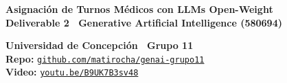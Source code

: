 \documentclass[9pt,a4paper]{extarticle}
\begin{document}
\fontsize{7.9}{9.1}\selectfont

\begin{tcolorbox}[colback=boxbg,colframe=boxframe,arc=1.5mm,boxrule=0.8pt,top=2pt,bottom=2pt,left=7pt,right=7pt]
\begin{minipage}[c]{0.64\textwidth}
    {\fontsize{11.5}{13}\selectfont \textbf{Asignación de Turnos Médicos con LLMs Open-Weight}}\\[1pt]
    {\fontsize{8.3}{9.5}\selectfont \textbf{Deliverable 2 \textbar\ Generative Artificial Intelligence (580694)}}
\end{minipage}\hfill
\begin{minipage}[c]{0.35\textwidth}\raggedleft
    {\fontsize{7.8}{9}\selectfont \textbf{Universidad de Concepción \textbar\ Grupo 11}}\\
    {\fontsize{6.8}{8}\selectfont \textbf{Repo:} \href{https://github.com/matirocha/genai-grupo11}{\texttt{github.com/matirocha/genai-grupo11}}}\\
    {\fontsize{6.8}{8}\selectfont \textbf{Video:} \href{https://youtu.be/B9UK7B3sv48}{\texttt{youtu.be/B9UK7B3sv48}}}
\end{minipage}
\end{tcolorbox}
\end{document}
